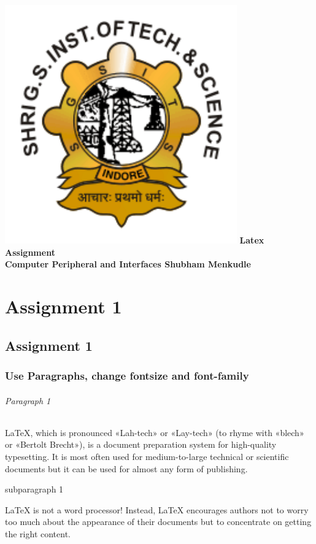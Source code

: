 \documentclass{report}
\begin{document}
   
    \begin{titlepage}
        \centering
        \vfill
        \includegraphics[width=10cm,keepaspectratio]{SGSITS-Indore-Logo.png}
        \vfill        
        {\bfseries\Huge
        \textcolor{shubham-blue}{Latex Assignment\\
            Computer Peripheral and Interfaces}
            \vskip2cm
            \textcolor{shubham-red}{Shubham Menkudle}
        }    
        \vfill
    \end{titlepage}

    \part{Assignment 1}
    \chapter{Assignment 1}
    \section{Use Paragraphs, change fontsize and font-family}
    \paragraph{Paragraph 1}
    
    LaTeX, which is pronounced «Lah-tech» or «Lay-tech» (to rhyme with «blech» or «Bertolt Brecht»), is a document preparation system for high-quality typesetting. It is most often used for medium-to-large technical or scientific documents but it can be used for almost any form of publishing.
    \subparagraph{subparagraph 1}
    LaTeX is not a word processor! Instead, LaTeX encourages authors not to worry too much about the appearance of their documents but to concentrate on getting the right content.
    
\end{document}
